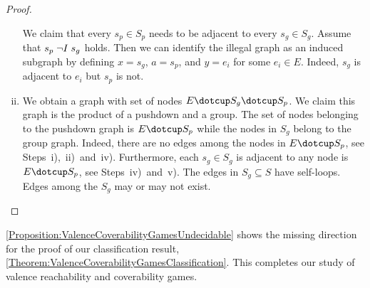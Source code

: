 \documentclass[../../diss.tex]{subfiles}
\begin{document}
\begin{proof}
\begin{enumerate}[i)]
            We claim that every $s_p \in S_p$ needs to be adjacent to every $s_g \in S_g$.
            Assume that $s_p \mathrel{\neg I} s_g$ holds.
            Then we can identify the  illegal graph as an induced subgraph by defining $x = s_g$, $a = s_p$, and $y = e_i$ for some $e_i \in E$.
            Indeed, $s_g$ is adjacent to $e_i$ but $s_p$ is not.
        \item
            We obtain a graph with set of nodes $E \dotcup S_g \dotcup S_p$.
            We claim this graph is the product of a pushdown and a group.
            The set of nodes belonging to the pushdown graph is $E \dotcup S_p$ while the nodes in $S_g$ belong to the group graph.
            Indeed, there are no edges among the nodes in $E \dotcup S_p$, see Steps~i),~ii)~and~iv).
            Furthermore, each $s_g \in S_g$ is adjacent to any node is $E \dotcup S_p$, see Steps~iv)~and~v).
            The edges in $S_g \subseteq S$ have self-loops.
            Edges among the $S_g$ may or may not exist.
    \end{enumerate}
    \vspace*{-2.5em}
\end{proof}

\cref{Proposition:ValenceCoverabilityGamesUndecidable} shows the missing direction for the proof of our classification result, \cref{Theorem:ValenceCoverabilityGamesClassification}.
This completes our study of valence reachability and coverability games.
\end{document}
